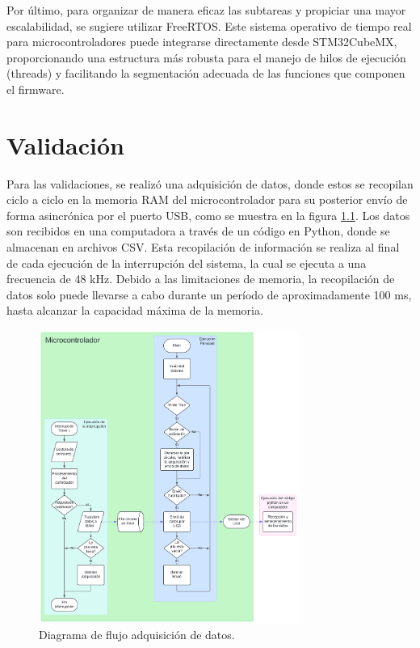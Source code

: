 \documentclass[11pt]{report}
\begin{document}
Por último, para organizar de manera eficaz las subtareas y propiciar una mayor escalabilidad, se sugiere utilizar FreeRTOS. Este sistema operativo de tiempo real para microcontroladores puede integrarse directamente desde STM32CubeMX, proporcionando una estructura más robusta para el manejo de hilos de ejecución (threads) y facilitando la segmentación adecuada de las funciones que componen el firmware.

\newpage
\chapter{Validación}
Para las validaciones, se realizó una adquisición de datos, donde estos se recopilan ciclo a ciclo en la memoria RAM del microcontrolador para su posterior envío de forma asincrónica por el puerto USB, como se muestra en la figura \ref{flujo_debug}. Los datos son recibidos en una computadora a través de un código en Python, donde se almacenan en archivos CSV. Esta recopilación de información se realiza al final de cada ejecución de la interrupción del sistema, la cual se ejecuta a una frecuencia de 48 kHz. Debido a las limitaciones de memoria, la recopilación de datos solo puede llevarse a cabo durante un período de aproximadamente 100 ms, hasta alcanzar la capacidad máxima de la memoria.

\begin{figure}[ht]
	\centering
	\includegraphics[width=0.76\textwidth]{imagenes/Diagramas/Debug USB.png}
	\caption{Diagrama de flujo adquisición de datos.}
	\label{flujo_debug}
\end{figure}
\FloatBarrier
\end{document}
